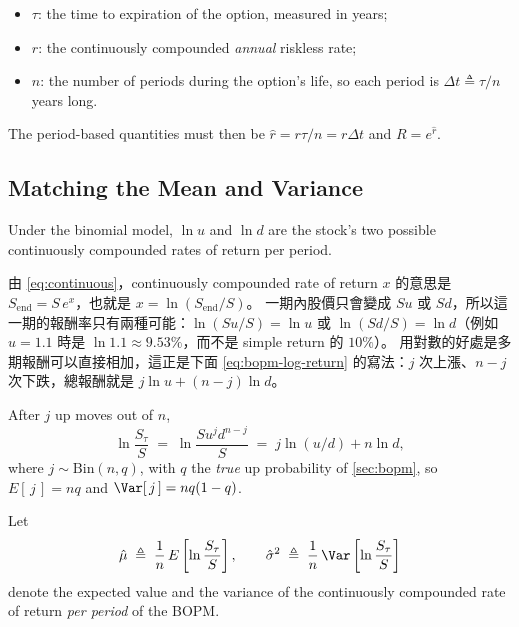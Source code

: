 \begin{notation}
	\begin{itemize}[nosep]
		\item $\tau$: the time to expiration of the option, measured in years;
		\item $r$: the continuously compounded \emph{annual} riskless rate;
		\item $n$: the number of periods during the option's life, so each period is $\Delta t\triangleq\tau/n$ years long.
	\end{itemize}
	The period-based quantities must then be $\hat{r}=r\tau/n=r\Delta t$ and $R=e^{\hat{r}}$.
\end{notation}

\subsection{Matching the Mean and Variance}
\label{sec:bs-step1}


\suppstart
{}
\suppend

Under the binomial model, $\ln u$ and $\ln d$ are the stock's two possible continuously compounded rates of return per period.

\suppstart
\begin{remark}
	由 \eqref{eq:continuous}，continuously compounded rate of return $x$ 的意思是 $S_{\text{end}}=S\,e^{x}$，也就是 $x=\ln(S_{\text{end}}/S)$。
	一期內股價只會變成 $Su$ 或 $Sd$，所以這一期的報酬率只有兩種可能：$\ln(Su/S)=\ln u$ 或 $\ln(Sd/S)=\ln d$（例如 $u=1.1$ 時是 $\ln1.1\approx9.53\%$，而不是 simple return 的 $10\%$）。
	用對數的好處是多期報酬可以直接相加，這正是下面 \eqref{eq:bopm-log-return} 的寫法：$j$ 次上漲、$n-j$ 次下跌，總報酬就是 $j\ln u+(n-j)\ln d$。
\end{remark}
After $j$ up moves out of $n$,
\begin{equation}
	\ln\frac{S_{\tau}}{S} \;=\; \ln\frac{Su^{j}d^{n-j}}{S} \;=\; j\ln(u/d)+n\ln d ,
	\label{eq:bopm-log-return}
\end{equation}
where $j\sim\mathrm{Bin}(n,q)$, with $q$ the \emph{true} up probability of \autoref{sec:bopm}, so $E[\,j\,]=nq$ and $\Var[\,j\,]=nq(1-q)$.
\suppend

\begin{definition}
	Let
	\[
		\hat{\mu} \;\triangleq\; \frac{1}{n}\,E\left[\ln\frac{S_{\tau}}{S}\right] ,
		\qquad
		\hat{\sigma}^{2} \;\triangleq\; \frac{1}{n}\,\Var\left[\ln\frac{S_{\tau}}{S}\right]
	\]
	denote the expected value and the variance of the continuously compounded rate of return \emph{per period} of the BOPM.
\end{definition}

